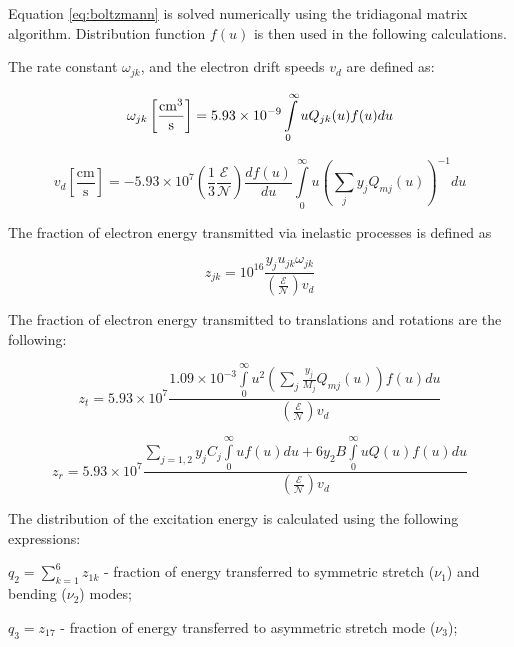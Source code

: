 Equation \ref{eq:boltzmann} is solved numerically using the tridiagonal matrix algorithm. Distribution function $f(u)$ is then used in the following calculations.

The rate constant $\omega_{jk}$, and the electron drift speeds $v_d$ are defined as:

\begin{equation}\label{eq:omega_jk}
\omega _{jk}\left[\frac{\rm{cm}^3}{\text{s}} \right] = 5.93 \times 10^{-9}\int\limits_0^\infty u Q_{jk}(u)f(u)du
\end{equation}
     
\begin{equation}\label{eq:v_d}
v_d \left[ \frac{\text{cm}}{\text{s}} \right] =  - 5.93 \times 10^7 \left( \frac{1}{3}\frac{\mathcal{E}}{\mathcal{N}} \right)\frac{df(u)}{du} \int\limits_0^\infty u \left( \sum\limits_j y_j Q_{mj}(u) \right)^{-1} du
\end{equation}

The fraction of electron energy transmitted via inelastic processes is defined as

\begin{equation}\label{eq:z_jk}
z_{jk} = 10^{16} \frac{y_j u_{jk} \omega _{jk}} {\left( \frac{\mathcal{E}}{\mathcal{N}} \right) v_d}   
\end{equation}

The fraction of electron energy transmitted to translations and rotations are the following:

\begin{equation}\label{eq:z_t}
z_t = 5.93 \times 10^7 \frac{1.09 \times 10^{-3} \int\limits_0^\infty u^2 \left( \sum\limits_j \frac{y_j}{M_j} Q_{mj}(u) \right)f(u)du} {\left( \frac{\mathcal{E}}{\mathcal{N}} \right) v_d}
\end{equation}

\begin{equation}\label{eq:z_r}
z_r = 5.93 \times 10^7 \frac{\sum\limits_{j=1,2} y_j C_j \int\limits_0^\infty uf(u)du + 6 y_2 B \int\limits_0^\infty u Q(u) f(u) du} {\left( \frac{\mathcal{E}}{\mathcal{N}} \right) v_d} 
\end{equation}

The distribution of the excitation energy is calculated using the following expressions:

$q_2 = \sum\limits_{k=1}^6 z_{1k}$ - fraction of energy transferred to  symmetric stretch ($\nu_1$) and bending ($\nu_2$) modes;

$q_3 = z_{17}$ - fraction of energy transferred to  asymmetric stretch mode ($\nu_3$);

